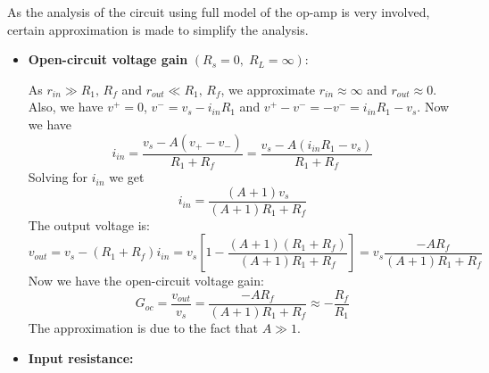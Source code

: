 \documentclass{article}
\begin{document}
\begin{itemize}
  As the analysis of the circuit using full model of the op-amp 
  is very involved, certain approximation is made to simplify the 
  analysis.
  \begin{itemize}
  \item {\bf Open-circuit voltage gain} $(R_s=0,\;R_L=\infty)$:

    As $r_{in}\gg R_1,\,R_f$ and $r_{out}\ll R_1,\,R_f$, we approximate
    $r_{in}\approx \infty$ and $r_{out}\approx 0$. Also, we have
    $v^+=0$, $v^-=v_s-i_{in} R_1$ and $v^+-v^-=-v^-=i_{in} R_1 -v_s$.
    Now we have
    \begin{equation}
      i_{in}=\frac{v_s-A(v_+-v_-)}{R_1+R_f}=\frac{v_s-A(i_{in} R_1-v_s)}{R_1+R_f}
    \end{equation}
    Solving for $i_{in}$ we get
    \begin{equation}
      i_{in}=\frac{(A+1)v_s}{(A+1)R_1+R_f}
    \end{equation}
    The output voltage is:
    \begin{equation}
      v_{out}=v_s-(R_1+R_f) i_{in}
      =v_s\left[1-\frac{(A+1)(R_1+R_f)}{(A+1)R_1+R_f}\right] 
      =v_s\frac{-AR_f}{(A+1)R_1+R_f}
    \end{equation} 
    Now we have the open-circuit voltage gain:
    \begin{equation}
      G_{oc}=\frac{v_{out}}{v_s}=\frac{-AR_f}{(A+1)R_1+R_f}
      \approx - \frac{R_f}{R_1} 
    \end{equation}
    The approximation is due to the fact that $A\gg 1$.

    \begin{comment}
      This approximate result can also be obtained under the virtual 
      ground assumption $v^-\approx v^+=0$. Applying KCL at the node of 
      $v^-$, we get
      \begin{equation}
        \frac{v_s}{R_1}+\frac{v_{out}}{R_f}=0,\;\;\;\;\;\mbox{i.e.}\;\;\;\;
        G_{oc}=\frac{v_{out}}{v_s}=-\frac{R_f}{R_1}
      \end{equation}
    \end{comment}

   \item {\bf Input resistance:} 


\end{itemize}
\end{itemize}
\end{document}
